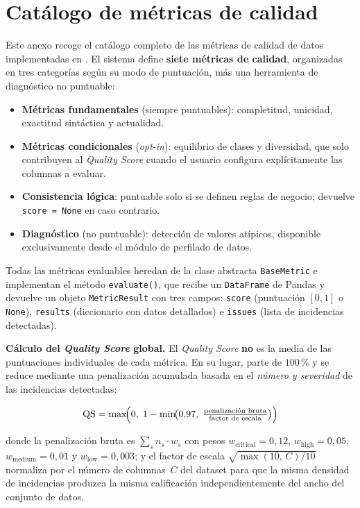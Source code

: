 \chapter{Catálogo de métricas de calidad}
\label{anx:metricas}

Este anexo recoge el catálogo completo de las métricas de calidad de datos
implementadas en \dataqual.  El sistema define \textbf{siete métricas de
calidad}, organizadas en tres categorías según su modo de puntuación, más una
herramienta de diagnóstico no puntuable:

\begin{itemize}
  \item \textbf{Métricas fundamentales} (siempre puntuables): completitud,
        unicidad, exactitud sintáctica y actualidad.
  \item \textbf{Métricas condicionales} (\emph{opt-in}): equilibrio de clases
        y diversidad, que solo contribuyen al \emph{Quality Score} cuando el
        usuario configura explícitamente las columnas a evaluar.
  \item \textbf{Consistencia lógica}: puntuable solo si se definen reglas de
        negocio; devuelve \texttt{score\,=\,None} en caso contrario.
  \item \textbf{Diagnóstico} (no puntuable): detección de valores atípicos,
        disponible exclusivamente desde el módulo de perfilado de datos.
\end{itemize}

Todas las métricas evaluables heredan de la clase abstracta
\texttt{BaseMetric} e implementan el método \texttt{evaluate()}, que recibe
un \texttt{DataFrame} de Pandas y devuelve un objeto \texttt{MetricResult}
con tres campos: \texttt{score} (puntuación $[0,\!1]$ o \texttt{None}),
\texttt{results} (diccionario con datos detallados) e \texttt{issues} (lista
de incidencias detectadas).

\medskip
\noindent\textbf{Cálculo del \emph{Quality Score} global.}\quad
El \emph{Quality Score} \textbf{no} es la media de las puntuaciones
individuales de cada métrica.  En su lugar, parte de $100$\,\% y se reduce
mediante una penalización acumulada basada en el \emph{número y severidad}
de las incidencias detectadas:

\[
  \text{QS} = \max\!\Bigl(0,\;
    1 - \min\!\bigl(0{,}97,\;\tfrac{\text{penalización bruta}}
                                    {\text{factor de escala}}\bigr)\Bigr)
\]

donde la penalización bruta es
$\sum_s n_s \cdot w_s$
con pesos $w_{\text{critical}}=0{,}12$, $w_{\text{high}}=0{,}05$,
$w_{\text{medium}}=0{,}01$ y $w_{\text{low}}=0{,}003$; y el factor de escala
$\sqrt{\max(10,\, C) / 10}$ normaliza por el número de columnas~$C$ del
dataset para que la misma densidad de incidencias produzca la misma
calificación independientemente del ancho del conjunto de datos.


